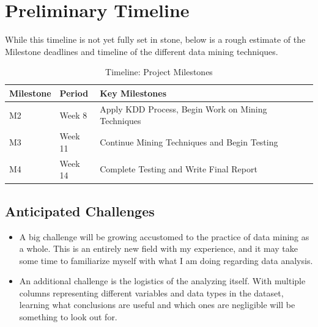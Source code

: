 \documentclass[conference]{IEEEtran}
\begin{document}
\section{Preliminary Timeline}
While this timeline is not yet fully set in stone, below is a rough estimate of the Milestone deadlines and timeline of the different data mining techniques.

\begin{table}[htbp]
    \caption{Timeline: Project Milestones}
    \begin{center}
        \begin{tabular}{@{}llp{4.5cm}@{}}
            \toprule
            \textbf{Milestone} & \textbf{Period} & \textbf{Key Milestones} \\ \midrule
            M2 & Week 8 & Apply KDD Process, Begin Work on Mining Techniques \\
            M3 & Week 11 & Continue Mining Techniques and Begin Testing \\
            M4 & Week 14 & Complete Testing and Write Final Report \\ \bottomrule
        \end{tabular}
    \end{center}   
\end{table}

\subsection{Anticipated Challenges}
\begin{itemize}
    \item A big challenge will be growing accustomed to the practice of data mining as a whole. This is an entirely new field with my experience, and it may take some time to familiarize myself with what I am doing regarding data analysis.
    \item An additional challenge is the logistics of the analyzing itself. With multiple columns representing different variables and data types in the dataset, learning what conclusions are useful and which ones are negligible will be something to look out for.
\end{itemize}
\end{document}
